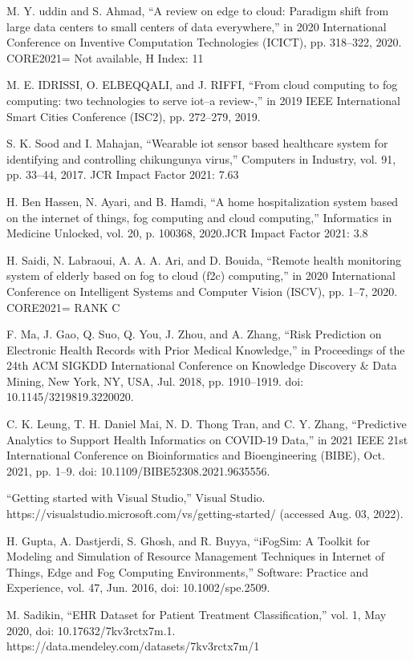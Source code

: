 \documentclass[10pt]{article}
\begin{document}
\begin{thebibliography}{40}
 M. Y. uddin and S. Ahmad, “A review on edge to cloud: Paradigm shift from large data centers
to small centers of data everywhere,” in 2020 International Conference on Inventive Computation
Technologies (ICICT), pp. 318–322, 2020. CORE2021= Not available, H Index: 11

 M. E. IDRISSI, O. ELBEQQALI, and J. RIFFI, “From cloud computing to fog computing: two
technologies to serve iot–a review-,” in 2019 IEEE International Smart Cities Conference (ISC2),
pp. 272–279, 2019.

 S. K. Sood and I. Mahajan, “Wearable iot sensor based healthcare system for identifying and
controlling chikungunya virus,” Computers in Industry, vol. 91, pp. 33–44, 2017. JCR Impact Factor
2021: 7.63

 H. Ben Hassen, N. Ayari, and B. Hamdi, “A home hospitalization system based on the internet of
things, fog computing and cloud computing,” Informatics in Medicine Unlocked, vol. 20, p. 100368,
2020.JCR Impact Factor 2021: 3.8

 H. Saidi, N. Labraoui, A. A. A. Ari, and D. Bouida, “Remote health monitoring system of elderly
based on fog to cloud (f2c) computing,” in 2020 International Conference on Intelligent Systems and
Computer Vision (ISCV), pp. 1–7, 2020. CORE2021= RANK C

 F. Ma, J. Gao, Q. Suo, Q. You, J. Zhou, and A. Zhang, “Risk Prediction on Electronic Health Records with Prior Medical Knowledge,” in Proceedings of the 24th ACM SIGKDD International Conference on Knowledge Discovery & Data Mining, New York, NY, USA, Jul. 2018, pp. 1910–1919. doi: 10.1145/3219819.3220020.

 C. K. Leung, T. H. Daniel Mai, N. D. Thong Tran, and C. Y. Zhang, “Predictive Analytics to Support Health Informatics on COVID-19 Data,” in 2021 IEEE 21st International Conference on Bioinformatics and Bioengineering (BIBE), Oct. 2021, pp. 1–9. doi: 10.1109/BIBE52308.2021.9635556.

 “Getting started with Visual Studio,” Visual Studio. https://visualstudio.microsoft.com/vs/getting-started/ (accessed Aug. 03, 2022).

 H. Gupta, A. Dastjerdi, S. Ghosh, and R. Buyya, “iFogSim: A Toolkit for Modeling and Simulation of Resource Management Techniques in Internet of Things, Edge and Fog Computing Environments,” Software: Practice and Experience, vol. 47, Jun. 2016, doi: 10.1002/spe.2509.

 M. Sadikin, “EHR Dataset for Patient Treatment Classification,” vol. 1, May 2020, doi:
10.17632/7kv3rctx7m.1. https://data.mendeley.com/datasets/7kv3rctx7m/1

\end{thebibliography}
\end{document}
